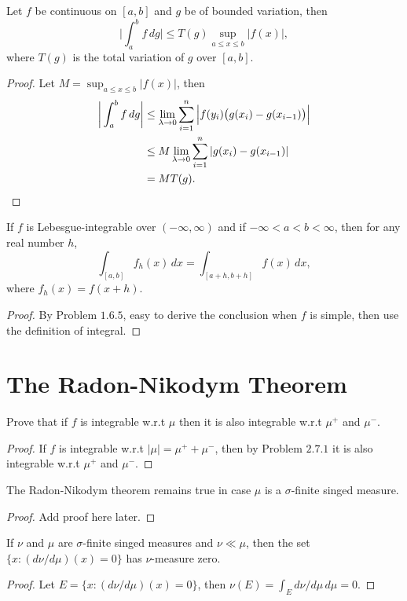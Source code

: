 \begin{pro}%
	Let $f$ be continuous on $[a,b]$ and $g$ be of bounded variation, then
	\[\bigg|\int_a^b f\,dg\bigg|\leq T(g)\sup_{a\leq x\leq b} |f(x)|,\]
	where $T(g)$ is the total variation of $g$ over $[a,b]$.
\end{pro}
\begin{proof}
	Let $M=\sup_{a\leq x\leq b} |f(x)|$, then
	\begin{align*}
	\bigg|\int_a^b f\,dg\bigg|&\leq \lim_{\lambda\to 0} \sum_{i=1}^n \Big|f(y_i)\big(g(x_i)-g(x_{i-1})\big)\Big|\\
							  &\leq M\lim_{\lambda\to 0} \sum_{i=1}^n |g(x_i)-g(x_{i-1})|\\
							  &=MT(g).
	\end{align*}
\end{proof}

\begin{pro}%
	If $f$ is Lebesgue-integrable over $(-\infty,\infty)$ and if $-\infty<a<b<\infty$, then for any real number $h$,
	\[\int_{[a,b]} f_h(x)\,dx=\int_{[a+h,b+h]} f(x)\,dx,\]
	where $f_h(x)=f(x+h)$.
\end{pro}
\begin{proof}
	By Problem $1.6.5$, easy to derive the conclusion when $f$ is simple, then use the definition of integral.
\end{proof}

\section{The Radon-Nikodym  Theorem}
\begin{pro}%
	Prove that if $f$ is integrable w.r.t $\mu$ then it is also integrable w.r.t $\mu^+$ and $\mu^-$. 
\end{pro}
\begin{proof}
	If $f$ is integrable w.r.t $|\mu|=\mu^+ + \mu^-$, then by Problem $2.7.1$ it is also integrable w.r.t $\mu^+$ and $\mu^-$.
\end{proof}

\begin{pro}%
	The Radon-Nikodym theorem remains true in case $\mu$ is a $\sigma$-finite singed measure.
\end{pro}
\begin{proof}
	Add proof here later.
\end{proof}

\begin{pro}%
	If $\nu$ and $\mu$ are $\sigma$-finite singed measures and $\nu\ll \mu$, then the set $\{x\colon (d\nu/d\mu)(x)=0\}$ has $\nu$-measure zero.
\end{pro}
\begin{proof}
	Let $E=\{x\colon (d\nu/d\mu)(x)=0\}$, then $\nu(E)=\int_E d\nu/d\mu\,d\mu=0$.
\end{proof}

